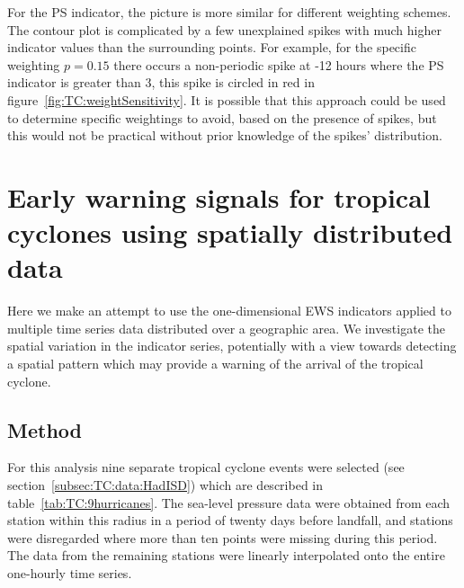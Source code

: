 For the PS indicator, the picture is more similar for different weighting schemes. The contour plot is complicated by a few unexplained spikes with much higher indicator values than the surrounding points. For example, for the specific weighting $p=0.15$ there occurs a non-periodic spike at -12 hours where the PS indicator is greater than $3$, this spike is circled in red in figure~\ref{fig:TC:weightSensitivity}. It is possible that this approach could be used to determine specific weightings to avoid, based on the presence of spikes, but this would not be practical without prior knowledge of the spikes' distribution.


\section[Spatially separated data]{Early warning signals for tropical cyclones using spatially distributed data}
\label{sec:TC:field_data}

Here we make an attempt to use the one-dimensional EWS indicators applied to multiple time series data distributed over a geographic area. We investigate the spatial variation in the indicator series, potentially with a view towards detecting a spatial pattern which may provide a warning of the arrival of the tropical cyclone. {}


\subsection{Method}
\label{subsec:TC:fieldmethod}

For this analysis nine separate tropical cyclone events were selected (see section~\ref{subsec:TC:data:HadISD}) which are described in table~\ref{tab:TC:9hurricanes}. {} The sea-level pressure data were obtained from each station within this radius in a period of twenty days before landfall, and stations were disregarded where more than ten points were missing during this period. The data from the remaining stations were linearly interpolated onto the entire one-hourly time series.

